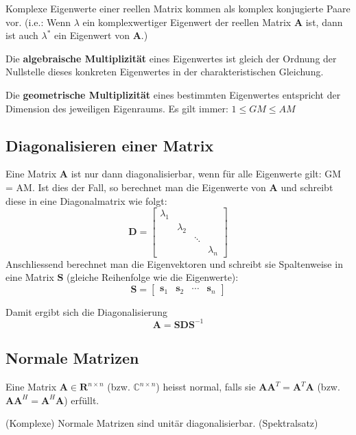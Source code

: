 \documentclass[11pt]{article}
\begin{document}
Komplexe Eigenwerte einer reellen Matrix kommen als komplex konjugierte Paare vor. (i.e.: Wenn $\lambda$ ein komplexwertiger Eigenwert der reellen Matrix $\mathbf{A}$ ist, dann ist auch $\lambda^{\ast}$ ein Eigenwert von $\mathbf{A}$.)

Die \textbf{algebraische Multiplizität} eines Eigenwertes ist gleich der Ordnung der Nullstelle dieses konkreten Eigenwertes in der charakteristischen Gleichung.

Die \textbf{geometrische Multiplizität} eines bestimmten Eigenwertes entspricht der Dimension des jeweiligen Eigenraums. Es gilt immer: $1 \leq GM \leq AM$

\subsection*{Diagonalisieren einer Matrix}
\vspace*{-0.5cm}
Eine Matrix $\mathbf{A}$ ist nur dann diagonalisierbar, wenn für alle Eigenwerte gilt: GM = AM. Ist dies der Fall, so berechnet man die Eigenwerte von $\mathbf{A}$ und schreibt diese in eine Diagonalmatrix wie folgt:
$$
\mathbf{D} = \begin{bmatrix}
    \lambda_1 & & & \\
    & \lambda_2 & & \\
    & & \ddots & \\
    & & & \lambda_n
\end{bmatrix}
$$
Anschliessend berechnet man die Eigenvektoren und schreibt sie Spaltenweise in eine Matrix $\mathbf{S}$ (gleiche Reihenfolge wie die Eigenwerte):
$$\mathbf{S} = \begin{bmatrix}
    \mathbf{s}_1 & \mathbf{s}_2 & \cdots & \mathbf{s}_n
\end{bmatrix}
    $$

Damit ergibt sich die Diagonalisierung
$$\mathbf{A} = \mathbf{SDS}^{-1}$$

\pagebreak

\subsection*{Normale Matrizen}
\vspace*{-0.5cm}
Eine Matrix $\mathbf{A} \in \mathbf{R}^{n\times n}$ (bzw. $\mathbb{C}^{n \times n}$) heisst normal, falls sie $\mathbf{AA}^T = \mathbf{A}^T \mathbf{A}$ (bzw. $\mathbf{AA}^H = \mathbf{A}^H \mathbf{A}$) erfüllt.

(Komplexe) Normale Matrizen sind unitär diagonalisierbar. (Spektralsatz)
\end{document}
